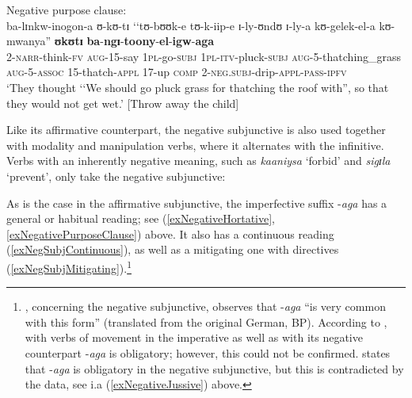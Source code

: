 \begin{exe}
\ex \label{exNegativePurposeClause}
Negative purpose clause:\\
\gll ba-lɪnkw-inogon-a ʊ-kʊ-tɪ \textup{\lq\lq}tʊ-bʊʊk-e tʊ-k-iip-e ɪ-ly-ʊndʊ ɪ-ly-a kʊ-gelek-el-a kʊ-mwanya\textup{''} \textbf{ʊkʊtɪ} \textbf{ba}-\textbf{ngɪ}-\textbf{toony}-\textbf{el}-\textbf{igw}-\textbf{aga}\\
2-\textsc{narr}-think-\textsc{fv} \textsc{aug}-15-say \phantom{\lq\lq}\textsc{1pl}-go-\textsc{subj} \textsc{1pl}-\textsc{itv}-pluck-\textsc{subj} \textsc{aug}-5-thatching\_grass \textsc{aug}-5-\textsc{assoc} 15-thatch-\textsc{appl} 17-up \textsc{comp} 2-\textsc{neg.subj}-drip-\textsc{appl}-\textsc{pass}-\textsc{ipfv}\\
\glt \lq They thought \lq\lq We should go pluck grass for thatching the roof with'', so that they would not get wet.' [Throw away the child]
\end{exe}
Like its affirmative counterpart, the negative subjunctive is also used together with modality and manipulation verbs, where it alternates with the infinitive. Verbs with an inherently negative meaning, such as \textit{kaaniysa} \lq forbid' and \textit{sigɪla} \lq  prevent', only take the negative subjunctive:

\begin{exe}
\ex
\begin{xlist}
\end{xlist}
\end{exe}

\pagebreak
As is the case in the affirmative subjunctive, the imperfective suffix \mbox{-\textit{aga}} has a general or habitual reading; see (\ref{exNegativeHortative}, \ref{exNegativePurposeClause}) above. It also has a continuous reading (\ref{exNegSubjContinuous}), as well as a mitigating one with directives (\ref{exNegSubjMitigating}).\footnote{\citet[34]{SchumannK1899}, concerning the negative subjunctive, observes that -\textit{aga} ``is very common with this form'' (translated from the original German, BP). According to \citet{NurseD1979}, with verbs of movement in the imperative as well as with its negative counterpart -\textit{aga} is obligatory; however, this could not be confirmed. \citet{MwangokaNVoorhoeveJ1960b} states that -\textit{aga} is obligatory in the negative subjunctive, but this is contradicted by the data, see i.a (\ref{exNegativeJussive}) above.}


